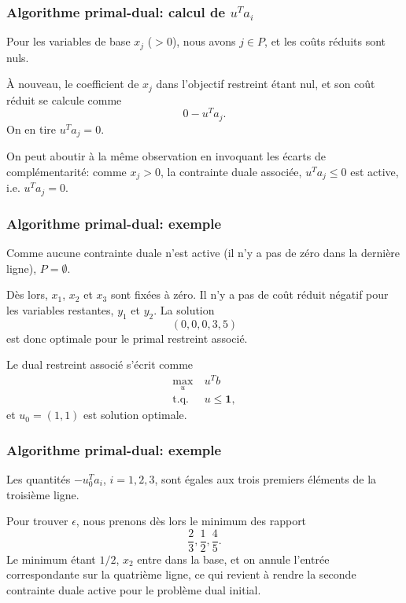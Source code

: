 \documentclass[t,usepdftitle=false]{beamer}
\def\bone{\boldsymbol{1}}
\begin{document}
\begin{frame}
\frametitle{Algorithme primal-dual: calcul de $u^Ta_i$}

Pour les variables de base $x_j$ ($> 0$), nous avons $j \in P$, et les coûts réduits sont nuls.

\mbox{}

À nouveau, le coefficient de $x_j$ dans l'objectif restreint étant nul, et son coût réduit se calcule comme
\[
0 - u^Ta_j.
\]
On en tire $u^T a_j = 0$.

\mbox{}

On peut aboutir à la même observation en invoquant les écarts de complémentarité: comme $x_j > 0$, la contrainte duale associée, $u^T a_j \leq 0$ est active, i.e. $u^T a_j = 0$.

\end{frame}

\begin{frame}
\frametitle{Algorithme primal-dual: exemple}

Comme aucune contrainte duale n'est active (il n'y a pas de zéro dans la dernière ligne), $P = \emptyset$.

\mbox{}

Dès lors, $x_1$, $x_2$ et $x_3$ sont fixées à zéro. Il n'y a pas de coût réduit négatif pour les variables restantes, $y_1$ et $y_2$. La solution
\[
(0, 0, 0, 3, 5)
\]
est donc optimale pour le primal restreint associé.

\mbox{}

Le dual restreint associé s'écrit comme
\begin{align*}
\max_u\ & u^T b\\
\mbox{t.q. } & u \leq \bone,
\end{align*}
et $u_0 = (1,1)$ est solution optimale.

\end{frame}

\begin{frame}
\frametitle{Algorithme primal-dual: exemple}

Les quantités $-u_0^Ta_i$, $i = 1, 2, 3$, sont égales aux trois premiers éléments de la troisième ligne.

\mbox{}

Pour trouver $\epsilon$, nous prenons dès lors le minimum des rapport
\[
\frac{2}{3}, \frac{1}{2}, \frac{4}{5}.
\]
Le minimum étant $1/2$, $x_2$ entre dans la base, et on annule l'entrée correspondante sur la quatrième ligne, ce qui revient à rendre la seconde contrainte duale active pour le problème dual initial.

\end{frame}
\end{document}
